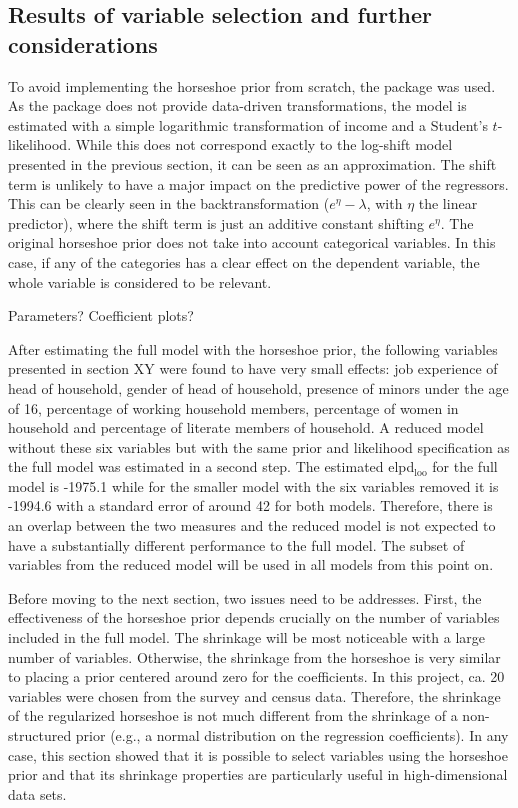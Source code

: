 \subsection{Results of variable selection and further considerations}
To avoid implementing the horseshoe prior from scratch, the package  was used.
As the package does not provide data-driven transformations, the model is estimated with a simple logarithmic transformation of income and a Student's $t$-likelihood.
While this does not correspond exactly to the log-shift model presented in the previous section, it can be seen as an approximation.
The shift term is unlikely to have a major impact on the predictive power of the regressors.
This can be clearly seen in the backtransformation ($e^\eta - \lambda$, with $\eta$ the linear predictor), where the shift term is just an additive constant shifting $e^\eta$.
The original horseshoe prior does not take into account categorical variables.
In this case, if any of the categories has a clear effect on the dependent variable, the whole variable is considered to be relevant.

Parameters? Coefficient plots?

After estimating the full model with the horseshoe prior, the following variables presented in section XY were found to have very small effects: job experience of head of household, gender of head of household, presence of minors under the age of 16, percentage of working household members, percentage of women in household and percentage of literate members of household.
A reduced model without these six variables but with the same prior and likelihood specification as the full model was estimated in a second step.
The estimated elpd$_{\text{loo}}$ for the full model is -1975.1 while for the smaller model with the six variables removed it is -1994.6 with a standard error of around 42 for both models.
Therefore, there is an overlap between the two measures and the reduced model is not expected to have a substantially different performance to the full model.
The subset of variables from the reduced model will be used in all models from this point on.

Before moving to the next section, two issues need to be addresses.
First, the effectiveness of the horseshoe prior depends crucially on the number of variables included in the full model.
The shrinkage will be most noticeable with a large number of variables.
Otherwise, the shrinkage from the horseshoe is very similar to placing a prior centered around zero for the coefficients.
In this project, ca. 20 variables were chosen from the survey and census data.
Therefore, the shrinkage of the regularized horseshoe is not much different from the shrinkage of a non-structured prior (e.g., a normal distribution on the regression coefficients).
In any case, this section showed that it is possible to select variables using the horseshoe prior and that its shrinkage properties are particularly useful in high-dimensional data sets.

